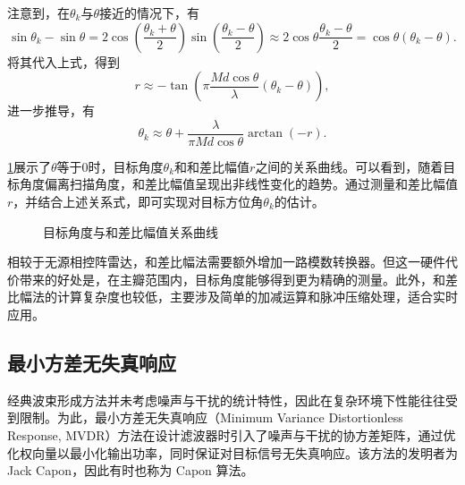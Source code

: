 注意到，在\( \theta_k \)与\( \theta \)接近的情况下，有
\[
    \sin \theta_k - \sin \theta = 2 \cos \left( \frac{\theta_k + \theta}{2} \right) \sin \left( \frac{\theta_k - \theta}{2} \right) \approx 2 \cos \theta  \frac{\theta_k - \theta}{2} = \cos \theta (\theta_k - \theta).
\]
将其代入上式，得到
\[
    r \approx - \tan \left( \pi \frac{M d \cos \theta}{\lambda} (\theta_k - \theta) \right),
\]
进一步推导，有
\[
    \theta_k \approx \theta + \frac{\lambda}{\pi M d \cos \theta} \arctan (-r).
\]

\cref{fig_ac}展示了\( \theta \)等于0时，目标角度\( \theta_k \)和和差比幅值\( r \)之间的关系曲线。可以看到，随着目标角度偏离扫描角度，和差比幅值呈现出非线性变化的趋势。通过测量和差比幅值\( r \)，并结合上述关系式，即可实现对目标方位角\( \theta_k \)的估计。

\begin{figure}[htb!]
    \centering
    \caption{目标角度与和差比幅值关系曲线}
    \label{fig_ac}
\end{figure}

相较于无源相控阵雷达，和差比幅法需要额外增加一路模数转换器。但这一硬件代价带来的好处是，在主瓣范围内，目标角度能够得到更为精确的测量。此外，和差比幅法的计算复杂度也较低，主要涉及简单的加减运算和脉冲压缩处理，适合实时应用。

\subsection{最小方差无失真响应}
经典波束形成方法并未考虑噪声与干扰的统计特性，因此在复杂环境下性能往往受到限制。为此，最小方差无失真响应（Minimum Variance Distortionless Response, MVDR）方法在设计滤波器时引入了噪声与干扰的协方差矩阵，通过优化权向量以最小化输出功率，同时保证对目标信号无失真响应。该方法的发明者为 Jack Capon，因此有时也称为 Capon 算法。


